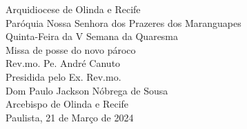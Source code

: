 \begin{center}
    \LARGE Arquidiocese de Olinda e Recife
    \vspace{.2cm} \\
    \Large Paróquia Nossa Senhora dos Prazeres dos Maranguapes
    \vspace{5cm} \\
    \textcolor{VioletRed2}{\huge Quinta-Feira da V Semana da Quaresma}
    \vspace{5cm} \\
    \Large Missa de posse do novo pároco \\ Rev.mo. Pe. André Canuto
    \vspace{.5cm} \\
    \Large Presidida pelo Ex. Rev.mo.
    \vspace{.2cm} \\
    \textcolor{VioletRed2}{\huge Dom Paulo Jackson Nóbrega de Sousa}
    \vspace{.2cm} \\
    \Large Arcebispo de Olinda e Recife
    \vspace{\fill}\\
    \Large Paulista, 21 de Março de 2024
\end{center}
